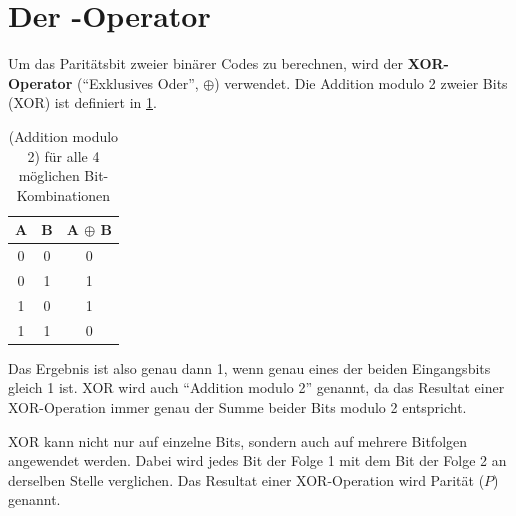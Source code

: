 \section{Der -Operator}

Um das Paritätsbit zweier binärer Codes zu berechnen, wird der \textbf{\acrshort{XOR}-Operator} (\enquote{Exklusives Oder}, $\oplus$) verwendet. Die Addition modulo 2 zweier Bits (\acrshort{XOR}) ist definiert in \cref{tab:mod2}.

\begin{table}[H]
    \centering
    \begin{tabular}{ccc}
        A & B & A $\oplus$ B \\\midrule
        0 & 0 & 0            \\\midrule
        0 & 1 & 1            \\\midrule
        1 & 0 & 1            \\\midrule
        1 & 1 & 0            \\
    \end{tabular}
    \caption{ (Addition modulo 2) für alle 4 möglichen Bit-Kombinationen}
    \label{tab:mod2}
\end{table}

Das Ergebnis ist also genau dann 1, wenn genau eines der beiden Eingangsbits gleich 1 ist. \acrshort{XOR} wird auch \enquote{Addition modulo 2} genannt, da das Resultat einer \acrshort{XOR}-Operation immer genau der Summe beider Bits modulo 2 entspricht.

\acrshort{XOR} kann nicht nur auf einzelne Bits, sondern auch auf mehrere Bitfolgen angewendet werden. Dabei wird jedes Bit der Folge 1 mit dem Bit der Folge 2 an derselben Stelle verglichen. Das Resultat einer \acrshort{XOR}-Operation wird Parität ($P$) genannt.


